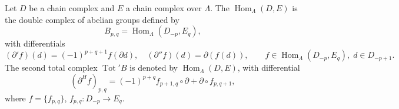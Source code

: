 Let $D$ be a chain complex and $E$ a chain complex over $\Lambda$. The  $\operatorname{Hom}_\Lambda(D, E)$ is the double complex of abelian groups defined by
$$B_{p,q} = \operatorname{Hom}_\Lambda(D_{-p}, E_q),$$
with differentials
$$(\partial' f)(d) = (-1)^{p+q+1} f(\partial d), \quad (\partial'' f)(d) = \partial(f(d)), \qquad f \in \operatorname{Hom}_\Lambda(D_{-p}, E_q), \; d \in D_{-p+1}.$$
The second total complex $\operatorname{Tot}' B$ is denoted by $\operatorname{Hom}_\Lambda(D, E)$, with differential
$$(\partial^H f)_{p,q} = (-1)^{p+q} f_{p+1,q} \circ \partial + \partial \circ f_{p,q+1},$$
where $f = \{f_{p,q}\}$, $f_{p,q} : D_{-p} \rightarrow E_q$.
